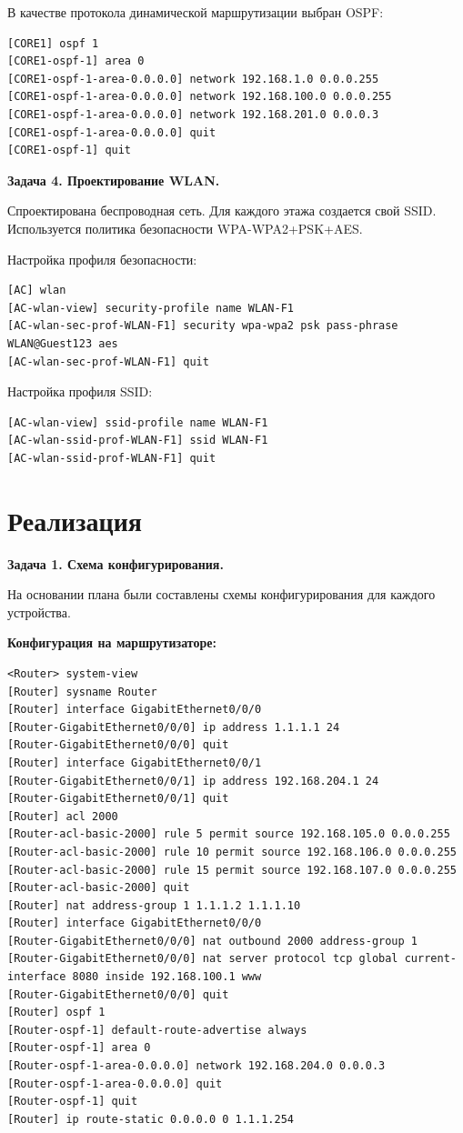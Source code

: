 В качестве протокола динамической маршрутизации выбран OSPF:

\begin{verbatim}
[CORE1] ospf 1
[CORE1-ospf-1] area 0
[CORE1-ospf-1-area-0.0.0.0] network 192.168.1.0 0.0.0.255
[CORE1-ospf-1-area-0.0.0.0] network 192.168.100.0 0.0.0.255
[CORE1-ospf-1-area-0.0.0.0] network 192.168.201.0 0.0.0.3
[CORE1-ospf-1-area-0.0.0.0] quit
[CORE1-ospf-1] quit
\end{verbatim}

\textbf{Задача 4. Проектирование WLAN.}

Спроектирована беспроводная сеть. Для каждого этажа создается свой SSID.
Используется политика безопасности WPA-WPA2+PSK+AES.

Настройка профиля безопасности:

\begin{verbatim}
[AC] wlan
[AC-wlan-view] security-profile name WLAN-F1
[AC-wlan-sec-prof-WLAN-F1] security wpa-wpa2 psk pass-phrase WLAN@Guest123 aes
[AC-wlan-sec-prof-WLAN-F1] quit
\end{verbatim}

Настройка профиля SSID:

\begin{verbatim}
[AC-wlan-view] ssid-profile name WLAN-F1
[AC-wlan-ssid-prof-WLAN-F1] ssid WLAN-F1
[AC-wlan-ssid-prof-WLAN-F1] quit
\end{verbatim}

\section{Реализация}

\textbf{Задача 1. Схема конфигурирования.}

На основании плана были составлены схемы конфигурирования для каждого устройства.

\textbf{Конфигурация на маршрутизаторе:}

\begin{verbatim}
<Router> system-view
[Router] sysname Router
[Router] interface GigabitEthernet0/0/0
[Router-GigabitEthernet0/0/0] ip address 1.1.1.1 24
[Router-GigabitEthernet0/0/0] quit
[Router] interface GigabitEthernet0/0/1
[Router-GigabitEthernet0/0/1] ip address 192.168.204.1 24
[Router-GigabitEthernet0/0/1] quit
[Router] acl 2000
[Router-acl-basic-2000] rule 5 permit source 192.168.105.0 0.0.0.255
[Router-acl-basic-2000] rule 10 permit source 192.168.106.0 0.0.0.255
[Router-acl-basic-2000] rule 15 permit source 192.168.107.0 0.0.0.255
[Router-acl-basic-2000] quit
[Router] nat address-group 1 1.1.1.2 1.1.1.10
[Router] interface GigabitEthernet0/0/0
[Router-GigabitEthernet0/0/0] nat outbound 2000 address-group 1
[Router-GigabitEthernet0/0/0] nat server protocol tcp global current-interface 8080 inside 192.168.100.1 www
[Router-GigabitEthernet0/0/0] quit
[Router] ospf 1
[Router-ospf-1] default-route-advertise always
[Router-ospf-1] area 0
[Router-ospf-1-area-0.0.0.0] network 192.168.204.0 0.0.0.3
[Router-ospf-1-area-0.0.0.0] quit
[Router-ospf-1] quit
[Router] ip route-static 0.0.0.0 0 1.1.1.254
\end{verbatim}

